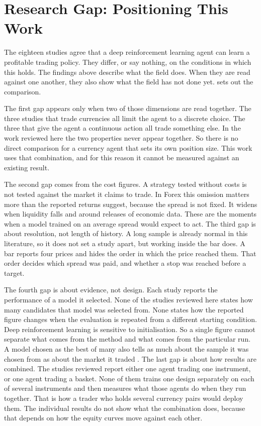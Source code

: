 \section{Research Gap: Positioning This Work}

The eighteen studies agree that a deep reinforcement learning agent can learn a profitable trading policy. They differ, or say nothing, on the conditions in which this holds. The findings above describe what the field does. When they are read against one another, they also show what the field has not done yet.  sets out the comparison.



The first gap appears only when two of those dimensions are read together. The three studies that trade currencies \cite{carapuco_reinforcement_2018, huang_financial_2018, rundo_deep_2019} all limit the agent to a discrete choice. The three that give the agent a continuous action \cite{majidi_algorithmic_2022, jia_lstm-ddpg_2021, zhang_deep_2020} all trade something else. In the work reviewed here the two properties never appear together. So there is no direct comparison for a currency agent that sets its own position size. This work uses that combination, and for this reason it cannot be measured against an existing result.

The second gap comes from the cost figures. A strategy tested without costs is not tested against the market it claims to trade. In Forex this omission matters more than the reported returns suggest, because the spread is not fixed. It widens when liquidity falls and around releases of economic data. These are the moments when a model trained on an average spread would expect to act. The third gap is about resolution, not length of history. A long sample is already normal in this literature, so it does not set a study apart, but working inside the bar does. A bar reports four prices and hides the order in which the price reached them. That order decides which spread was paid, and whether a stop was reached before a target.

The fourth gap is about evidence, not design. Each study reports the performance of a model it selected. None of the studies reviewed here states how many candidates that model was selected from. None states how the reported figure changes when the evaluation is repeated from a different starting condition. Deep reinforcement learning is sensitive to initialisation. So a single figure cannot separate what comes from the method and what comes from the particular run. A model chosen as the best of many also tells as much about the sample it was chosen from as about the market it traded \cite{bailey_pseudo-mathematics_2014, lopez_de_prado_advances_2018}. The last gap is about how results are combined. The studies reviewed report either one agent trading one instrument, or one agent trading a basket. None of them trains one design separately on each of several instruments and then measures what those agents do when they run together. That is how a trader who holds several currency pairs would deploy them. The individual results do not show what the combination does, because that depends on how the equity curves move against each other.

